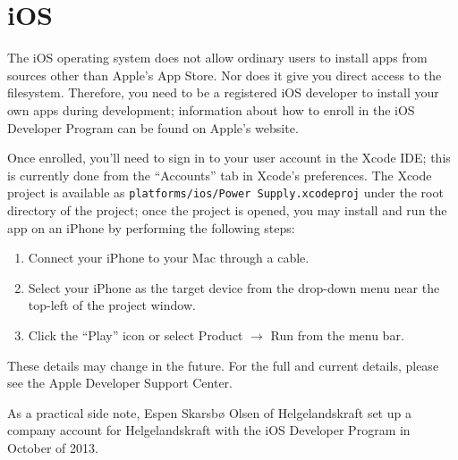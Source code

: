 \clearpage
\section{iOS}

The iOS operating system does not allow ordinary users to install apps from
sources other than Apple's App Store. Nor does it give you direct access to the
filesystem. Therefore, you need to be a registered iOS developer to install
your own apps during development; information about how to enroll in the iOS
Developer Program can be found on Apple's website\cite{iOSDevProgram}.

Once enrolled, you'll need to sign in to your user account in the Xcode IDE;
this is currently done from the ``Accounts'' tab in Xcode's preferences.
The Xcode project is available as \mbox{\texttt{platforms/ios/Power 
Supply.xcodeproj}} under the root directory of the project; once the project
is opened, you may install and run the app on an iPhone by performing the
following steps:

\begin{enumerate}
  \item Connect your iPhone to your Mac through a cable.
  \item Select your iPhone as the target device from the drop-down menu near
        the top-left of the project window.
  \item Click the ``Play'' icon or select Product $\rightarrow$ Run from the
        menu bar.
\end{enumerate}

These details may change in the future. For the full and current details,
please see the Apple Developer Support Center\cite{appleSupport}.

As a practical side note, Espen Skarsbø Olsen of Helgelandskraft set up a
company account for Helgelandskraft with the iOS Developer Program in October
of 2013.
